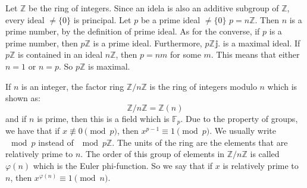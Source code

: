 \documentclass{report}
\begin{document}
\begin{examples}
    \begin{example}
        Let $\mathbb{Z}$ be the ring of integers. Since an idela is also an additive subgroup of $\mathbb{Z}$, every ideal $\neq \{0\}$ is principal. Let $p$ be a prime ideal $\neq \{0\}$ $p = n\mathbb{Z}$. Then $n$ is a prime number, by the definition of prime ideal. As for the converse, if $p$ is a prime number, then $p\mathbb{Z}$ is a prime ideal. Furthermore, $p\mathbb{Zj}$. is a maximal ideal. If $p\mathbb{Z}$ is contained in an ideal $n\mathbb{Z}$, then $p = nm$ for some $m$. This means that either $n = 1$ or $n = p$. So $p\mathbb{Z}$ is maximal.
    \end{example}
\end{examples}

If $n$ is an integer, the factor ring $\mathbb{Z}/n\mathbb{Z}$ is the ring of integers modulo $n$ which is shown as:
    \begin{equation*}
        \mathbb{Z}/n\mathbb{Z} = \mathbb{Z}(n)
    \end{equation*}
and if $n$ is prime, then this is a field which is $\mathbb{F}_{p}$. Due to the property of groups, we have that if $x \not\equiv 0 \pmod{p}$, then $x^{p - 1} \equiv 1 \pmod{p}$. We usually write $\mod{p}$ instead of $\mod{p\mathbb{Z}}$. The units of the ring are the elements that are relatively prime to $n$. The order of this group of elements in $\mathbb{Z}/n\mathbb{Z}$ is called $\varphi(n)$ which is the Euler phi-function. So we say that if $x$ is relatively prime to $n$, then $x^{\varphi(n)} \equiv 1\pmod{n}$.
\end{document}
